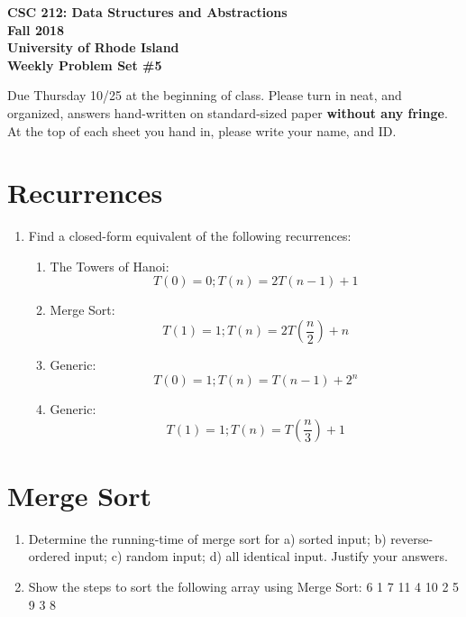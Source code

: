 \documentclass[11pt]{article}
\begin{document}
    \thispagestyle{empty}
    
    \begin{center}
        {\Large\bf CSC 212: Data Structures and Abstractions}\\
        \medskip
        {\Large\bf Fall 2018}\\
        \medskip
        {\Large\bf University of Rhode Island}\\
        \bigskip
        {\Large\bf Weekly Problem Set \#5}
    \end{center}
    
    Due Thursday 10/25 at the beginning of class. Please turn in neat, and organized, answers hand-written on standard-sized paper \textbf{without any fringe}. At the top of each sheet you hand in, please write your name, and ID.
    
    \section{Recurrences}
    \begin{enumerate}
        \item Find a closed-form equivalent of the following recurrences:
        \begin{enumerate} 
            \item The Towers of Hanoi:
            $$T(0) = 0; T(n) = 2T(n-1) + 1$$
            \item Merge Sort:
            $$T(1) = 1; T(n) = 2T(\frac{n}{2}) + n$$
            \item Generic:
            $$T(0) = 1; T(n) = T(n - 1) + 2^n$$
            \item Generic:
            $$T(1) = 1; T(n) = T(\frac{n}{3}) + 1$$
        \end{enumerate}
    
    \end{enumerate}
    \section{Merge Sort} 
    \begin{enumerate}
    
        \item Determine the running-time of merge sort for a) sorted input; b) reverse-ordered input; c) random input; d) all identical input. Justify your answers.
       \item Show the steps to sort the following array using Merge Sort: 6 1 7 11 4 10 2 5 9 3 8
    \end{enumerate}
\end{document}
